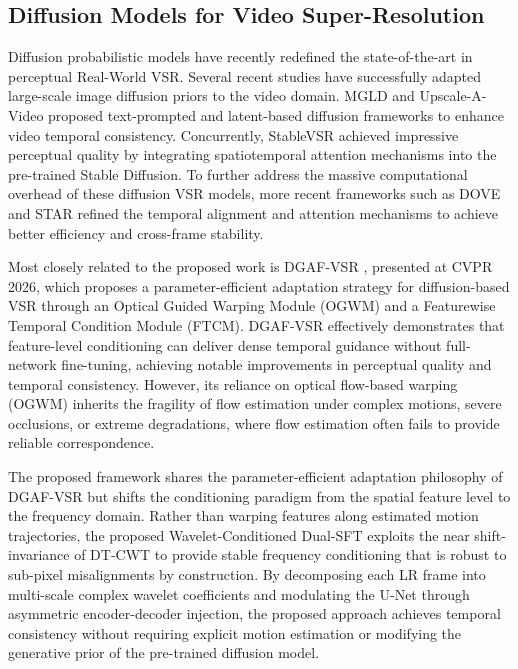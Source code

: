 \subsection{Diffusion Models for Video Super-Resolution}
Diffusion probabilistic models have recently redefined the state-of-the-art in perceptual Real-World VSR. Several recent studies have successfully adapted large-scale image diffusion priors to the video domain. MGLD \cite{yang2024mgld} and Upscale-A-Video \cite{zhou2024upscaleavideo} proposed text-prompted and latent-based diffusion frameworks to enhance video temporal consistency. Concurrently, StableVSR \cite{rota2024stablevsr} achieved impressive perceptual quality by integrating spatiotemporal attention mechanisms into the pre-trained Stable Diffusion. To further address the massive computational overhead of these diffusion VSR models, more 
recent frameworks such as DOVE \cite{dove2025} and STAR \cite{xie2025star} refined the temporal alignment and attention mechanisms to achieve better efficiency and cross-frame stability.

Most closely related to the proposed work is DGAF-VSR \cite{xu2026dgaf}, presented at CVPR 2026, which proposes a parameter-efficient adaptation strategy for diffusion-based VSR through an Optical Guided Warping Module (OGWM) and a Featurewise Temporal Condition Module (FTCM). DGAF-VSR effectively demonstrates that feature-level conditioning can deliver dense temporal guidance without full-network fine-tuning, achieving notable improvements in perceptual quality and temporal consistency. However, its reliance on optical flow-based warping (OGWM) inherits the fragility of flow estimation under complex motions, severe occlusions, or 
extreme degradations, where flow estimation often fails to provide reliable correspondence.

The proposed framework shares the parameter-efficient adaptation philosophy of DGAF-VSR but shifts the conditioning paradigm from the spatial feature level to the frequency domain. Rather than warping features along estimated motion trajectories, the proposed Wavelet-Conditioned Dual-SFT exploits the near 
shift-invariance of DT-CWT to provide stable frequency conditioning that is robust to sub-pixel misalignments by construction. By decomposing each LR frame into multi-scale complex wavelet coefficients and modulating the U-Net through asymmetric encoder-decoder injection, the proposed approach achieves temporal consistency without requiring explicit motion estimation or modifying the generative prior of the pre-trained diffusion model.


